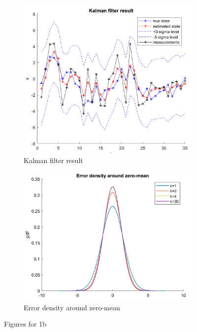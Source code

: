 \begin{figure}[H]
    \centering
    \begin{subfigure}[b]{0.45\textwidth}
        \includegraphics[width=\textwidth]{images/kalmanfilterresult.png}
        \caption{Kalman filter result}
        \label{1b1}
    \end{subfigure}
    \hfill
    \begin{subfigure}[b]{0.45\textwidth}
        \includegraphics[width=\textwidth]{images/errordensity.png}
        \caption{Error density around zero-mean}
        \label{1b2}
    \end{subfigure}
    \caption{Figures for 1b}
    \label{1b}
    \end{figure}
  
